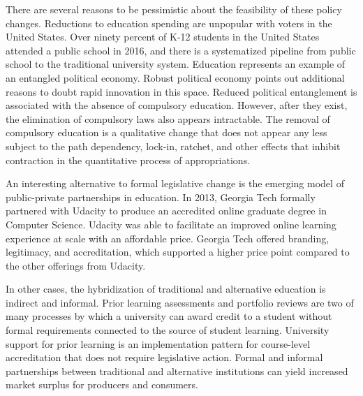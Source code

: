 \documentclass[review]{elsarticle}
\begin{document}
There are several reasons to be pessimistic about the feasibility of these policy changes.
Reductions to education spending are unpopular with voters in the United States.
Over ninety percent of K-12 students in the United States attended a public school in 2016\cite{us2019digest},
and there is a systematized pipeline from public school to the traditional university system.
Education represents an example of an entangled political economy\cite{wagner2014entangled}.
Robust political economy points out additional reasons to doubt rapid innovation in this space\cite{boettke2004liberalism}.
Reduced political entanglement is associated with the absence of compulsory education.
However, after they exist, the elimination of compulsory laws also appears intractable.
The removal of compulsory education is a qualitative change that does not appear any less subject to the path dependency,
lock-in, ratchet, and other effects that inhibit contraction in the quantitative process of appropriations.

An interesting alternative to formal legislative change is the emerging model of public-private partnerships in education.
In 2013, Georgia Tech formally partnered with Udacity to produce an accredited online graduate degree in Computer Science\cite{empson_2013}.
Udacity was able to facilitate an improved online learning experience at scale with an affordable price.
Georgia Tech offered branding, legitimacy, and accreditation, which supported a higher price point compared to the other offerings from Udacity.

In other cases, the hybridization of traditional and alternative education is indirect and informal.
Prior learning assessments and portfolio reviews are two of many processes by which a university can award credit to a student
without formal requirements connected to the source of student learning\cite{conrad2008building}.
University support for prior learning is an implementation pattern for course-level accreditation that does not require legislative action.
Formal and informal partnerships between traditional and alternative institutions can yield increased market surplus for producers and consumers.
\end{document}

